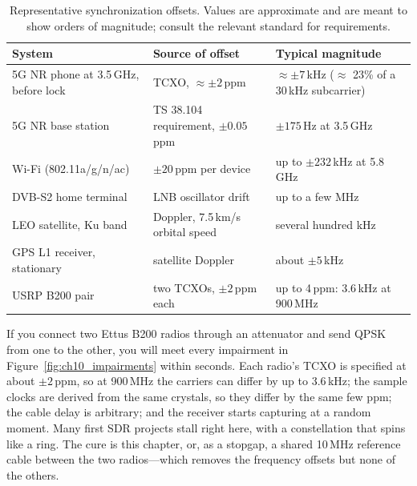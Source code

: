 \begin{table}[htbp]\centering\small
\caption{Representative synchronization offsets. Values are approximate and are meant to show orders
of magnitude; consult the relevant standard for requirements.}
\label{tab:ch10:offsets}
\begin{tabular}{>{\raggedright\arraybackslash}p{4.1cm}>{\raggedright\arraybackslash}p{4.3cm}>{\raggedright\arraybackslash}p{4.9cm}}
\toprule
System & Source of offset & Typical magnitude \\
\midrule
5G NR phone at 3.5\,GHz, before lock & TCXO, $\approx\pm2$\,ppm & $\approx\pm7$\,kHz ($\approx$ 23\% of a 30\,kHz subcarrier)\\
5G NR base station & TS 38.104 requirement, $\pm0.05$\,ppm & $\pm175$\,Hz at 3.5\,GHz \\
Wi-Fi (802.11a/g/n/ac) & $\pm20$\,ppm per device & up to $\pm232$\,kHz at 5.8\,GHz \\
DVB-S2 home terminal & LNB oscillator drift & up to a few MHz \\
LEO satellite, Ku band & Doppler, 7.5\,km/s orbital speed & several hundred kHz \\
GPS L1 receiver, stationary & satellite Doppler & about $\pm5$\,kHz \\
USRP B200 pair & two TCXOs, $\pm2$\,ppm each & up to 4\,ppm: 3.6\,kHz at 900\,MHz \\
\bottomrule
\end{tabular}
\end{table}


\begin{inpractice}
If you connect two Ettus B200 radios through an attenuator and send QPSK from one to the other,
you will meet every impairment in Figure~\ref{fig:ch10_impairments} within seconds. Each radio's
TCXO is specified at about $\pm2$\,ppm, so at 900\,MHz the carriers can differ by up to 3.6\,kHz;
the sample clocks are derived from the same crystals, so they differ by the same few ppm; the
cable delay is arbitrary; and the receiver starts capturing at a random moment. Many first SDR
projects stall right here, with a constellation that spins like a ring. The cure is this chapter,
or, as a stopgap, a shared 10\,MHz reference cable between the two radios---which removes the
frequency offsets but none of the others.
\end{inpractice}

